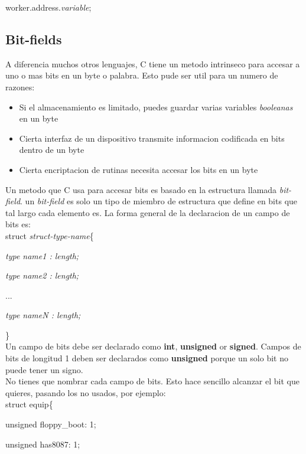 \documentclass[]{article}
\begin{document}
			worker.address.\textit{variable};\\
				
			\subsection{Bit-fields}
			
			A diferencia muchos otros lenguajes, C tiene un metodo intrinseco para accesar a uno o mas bits en un byte o palabra. Esto pude ser util para un numero de razones:
			
			\begin{itemize}
				\item Si el almacenamiento es limitado, puedes guardar varias variables \textit{booleanas} en un byte
				\item Cierta interfaz de un dispositivo transmite informacion codificada en bits dentro de un byte
				\item Cierta encriptacion de rutinas necesita accesar los bits en un byte
			\end{itemize}
		
			Un metodo que C usa para accesar bits es basado en la estructura llamada \textit{bit-field}. un \textit{bit-field} es solo un tipo de miembro de estructura que define en bits que tal largo cada elemento es. La forma general de la declaracion de un campo de bits es:\\
			
			struct \textit{struct-type-name}\{
			
			\textit{type name1 : length;}

			\textit{type name2 : length;}
			
			...
			
			\textit{type nameN : length;}
						
			\}\\
			
			Un campo de bits debe ser declarado como \textbf{int}, \textbf{unsigned} or \textbf{signed}. Campos de bits de longitud 1 deben ser declarados como \textbf{unsigned} porque un solo bit no puede tener un signo.\\
			
			No tienes que nombrar cada campo de bits. Esto hace sencillo alcanzar el bit que quieres, pasando los no usados, por ejemplo:\\
			
			struct equip\{
			
			unsigned floppy\_boot: 1;
			
			unsigned has8087: 1;
			
\end{document}
